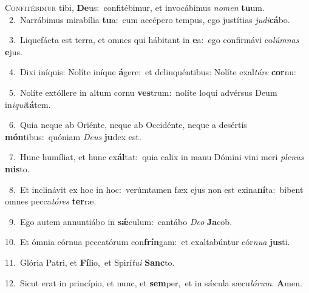 \lettrine{\initial\textcolor{\initialcolor}{C}}{onfitébimur} tibi, \textbf{De}\-us:~\star confitébimur, et invocábimus \textit{no}\-\textit{men} \textbf{tu}\-um.\\
{\numbfont\textcolor{\numbcolor}{~2.}}~Narrábimus mirabília \textbf{tu}\-a:~\star cum accépero tempus, ego justítias \textit{ju}\-\textit{di}\textbf{cá}bo.\par
{\numbfont\textcolor{\numbcolor}{~3.}}~Liquefácta est terra, et omnes qui hábitant in \textbf{e}\-a:~\star ego confirmávi co\-\textit{lúm}\-\textit{nas} \textbf{e}\-jus.\par
{\numbfont\textcolor{\numbcolor}{~4.}}~Dixi iníquis: Nolíte iníque \textbf{á}\-gere:~\star et delinquéntibus: Nolíte exal\-\textit{tá}\-\textit{re} \textbf{cor}\-nu:\par
{\numbfont\textcolor{\numbcolor}{~5.}}~Nolíte extóllere in altum cornu \textbf{ves}\-trum:~\star nolíte loqui advérsus Deum in\-\textit{i}\-\textit{qui}\textbf{tá}tem.\par
{\numbfont\textcolor{\numbcolor}{~6.}}~Quia neque ab Oriénte, neque ab Occidénte, neque a desértis \textbf{món}\-tibus:~\star quóniam \textit{De}\-\textit{us} \textbf{ju}\-dex est.\par
{\numbfont\textcolor{\numbcolor}{~7.}}~Hunc humíliat, et hunc ex\-\textbf{ál}\-tat:~\star quia calix in manu Dómini vini meri \textit{ple}\-\textit{nus} \textbf{mis}\-to.\par
{\numbfont\textcolor{\numbcolor}{~8.}}~Et inclinávit ex hoc in hoc:~\dagger verúmtamen fæx ejus non est exina\-\textbf{ní}\-ta:~\star bibent omnes pecca\-\textit{tó}\-\textit{res} \textbf{ter}\-ræ.\par
{\numbfont\textcolor{\numbcolor}{~9.}}~Ego autem annuntiábo in \textbf{sǽ}\-culum:~\star cantábo \textit{De}\-\textit{o} \textbf{Ja}\-cob.\par
{\numbfont\textcolor{\numbcolor}{10.}}~Et ómnia córnua peccatórum con\-\textbf{frín}\-gam:~\star et exaltabúntur cór\-\textit{nu}\-\textit{a} \textbf{jus}\-ti.\par
{\numbfont\textcolor{\numbcolor}{11.}}~Glória Patri, et \textbf{Fí}\-lio,~\star et Spirí\-\textit{tu}\-\textit{i} \textbf{Sanc}\-to.\par
{\numbfont\textcolor{\numbcolor}{12.}}~Sicut erat in princípio, et nunc, et \textbf{sem}\-per,~\star et in sǽcula sæcu\-\textit{ló}\-\textit{rum}. \textbf{A}\-men.\par
